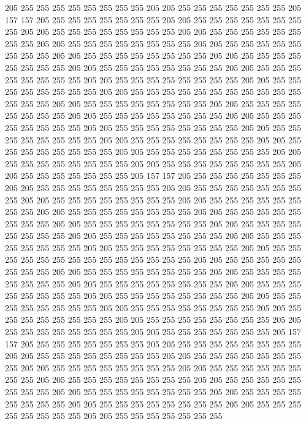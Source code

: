 205 255 255 255 255 255 255 255 255 205 205 255 255 255 255 255 255 255 205 157
157 205 255 255 255 255 255 255 255 205 205 255 255 255 255 255 255 255 255 205
205 255 255 255 255 255 255 255 255 205 205 255 255 255 255 255 255 255 255 205
205 255 255 255 255 255 255 255 255 205 205 255 255 255 255 255 255 255 255 205
205 255 255 255 255 255 255 255 255 205 205 255 255 255 255 255 255 255 255 205
205 255 255 255 255 255 255 255 255 205 205 255 255 255 255 255 255 255 255 205
205 255 255 255 255 255 255 255 255 205 205 255 255 255 255 255 255 255 255 205
205 255 255 255 255 255 255 255 255 255 255 255 255 255 255 205 205 255 255 255
255 255 255 255 255 205 205 255 255 255 255 255 255 255 255 205 205 255 255 255
255 255 255 255 255 205 205 255 255 255 255 255 255 255 255 205 205 255 255 255
255 255 255 255 255 205 205 255 255 255 255 255 255 255 255 205 205 255 255 255
255 255 255 255 255 205 205 255 255 255 255 255 255 255 255 205 205 255 255 255
255 255 255 255 255 205 205 255 255 255 255 255 255 255 255 205 205 255 255 255
255 255 255 255 255 205 205 255 255 255 255 255 255 255 205 157 157 205 255 255
255 255 255 255 255 205 205 255 255 255 255 255 255 255 255 205 205 255 255 255
255 255 255 255 255 205 205 255 255 255 255 255 255 255 255 205 205 255 255 255
255 255 255 255 255 205 205 255 255 255 255 255 255 255 255 205 205 255 255 255
255 255 255 255 255 205 205 255 255 255 255 255 255 255 255 205 205 255 255 255
255 255 255 255 255 205 205 255 255 255 255 255 255 255 255 205 205 255 255 255
255 255 255 255 255 205 205 255 255 255 255 255 255 255 255 205 205 255 255 255
255 255 255 255 255 255 255 255 255 255 255 205 205 255 255 255 255 255 255 255
255 205 205 255 255 255 255 255 255 255 255 205 205 255 255 255 255 255 255 255
255 205 205 255 255 255 255 255 255 255 255 205 205 255 255 255 255 255 255 255
255 205 205 255 255 255 255 255 255 255 255 205 205 255 255 255 255 255 255 255
255 205 205 255 255 255 255 255 255 255 255 205 205 255 255 255 255 255 255 255
255 205 205 255 255 255 255 255 255 255 255 205 205 255 255 255 255 255 255 255
255 205 205 255 255 255 255 255 255 255 205 157 157 205 255 255 255 255 255 255
255 205 205 255 255 255 255 255 255 255 255 205 205 255 255 255 255 255 255 255
255 205 205 255 255 255 255 255 255 255 255 205 205 255 255 255 255 255 255 255
255 205 205 255 255 255 255 255 255 255 255 205 205 255 255 255 255 255 255 255
255 205 205 255 255 255 255 255 255 255 255 205 205 255 255 255 255 255 255 255
255 205 205 255 255 255 255 255 255 255 255 205 205 255 255 255 255 255 255 255
255 205 205 255 255 255 255 255 255 255 255 205 205 255 255 255 255 255 255 255
